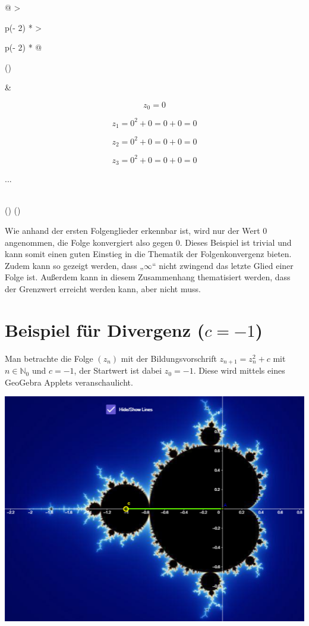 \documentclass[a4paper, 12pt]{book}
\begin{document}
\begin{longtable}[]{@{}
  >{\raggedright\arraybackslash}p{(\columnwidth - 2\tabcolsep) * }
  >{\raggedright\arraybackslash}p{(\columnwidth - 2\tabcolsep) * }@{}}
\toprule()
\begin{minipage}[b]{\linewidth}\raggedright
\end{minipage} & \begin{minipage}[b]{\linewidth}\raggedright
\[z_{0} = 0\]

\[z_{1} = 0^{2} + 0 = 0 + 0 = 0\]

\[z_{2} = 0^{2} + 0 = 0 + 0 = 0\]

\[z_{3} = 0^{2} + 0 = 0 + 0 = 0\]

...
\end{minipage} \\
\midrule()
\endhead
\bottomrule()
\end{longtable}

Wie anhand der ersten Folgenglieder erkennbar ist, wird nur der Wert 0
angenommen, die Folge konvergiert also gegen 0. Dieses Beispiel ist
trivial und kann somit einen guten Einstieg in die Thematik der
Folgenkonvergenz bieten. Zudem kann so gezeigt werden, dass
„\(\infty\)`` nicht zwingend das letzte Glied einer Folge ist. Außerdem
kann in diesem Zusammenhang thematisiert werden, dass der Grenzwert
erreicht werden kann, aber nicht muss.

\section{Beispiel für Divergenz ($c=-1$)}

Man betrachte die Folge \(\left( z_{n} \right)\) mit der
Bildungsvorschrift \(z_{n + 1} = z_{n}^{2} + c\) mit
\(n \in \mathbb{N}_{0}\) und \(c =  - 1\), der Startwert ist dabei
\(z_{0} =  - 1\). Diese wird mittels eines GeoGebra Applets
veranschaulicht.

\includegraphics[width=\linewidth]{image10.png}
\end{document}
